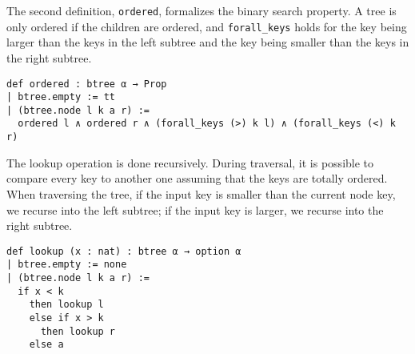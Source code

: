 The second definition, \lstinline{ordered}, formalizes the binary search property. A tree is only ordered if the children are ordered, and \lstinline{forall_keys} holds for the key being larger than the keys in the left subtree and the key being smaller than the keys in the right subtree.

\begin{lstlisting}
def ordered : btree α → Prop
| btree.empty := tt
| (btree.node l k a r) :=
  ordered l ∧ ordered r ∧ (forall_keys (>) k l) ∧ (forall_keys (<) k r)
\end{lstlisting}

The lookup operation is done recursively. During traversal, it is possible to compare every key to another one assuming that the keys are totally ordered. When traversing the tree, if the input key is smaller than the current node key, we recurse into the left subtree; if the input key is larger, we recurse into the right subtree. 

\begin{lstlisting}
def lookup (x : nat) : btree α → option α
| btree.empty := none
| (btree.node l k a r) :=
  if x < k 
    then lookup l
    else if x > k 
      then lookup r
    else a
\end{lstlisting}